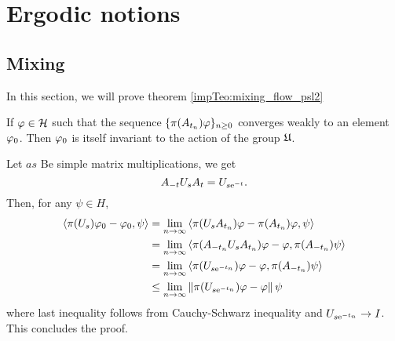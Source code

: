 
\chapter{Ergodic notions} %

\label{AppendixA} %
\thispagestyle{empty}
%
%
%
%
%
%
%
%
%


\section{Mixing}

In this section, we will prove theorem \ref{impTeo:mixing_flow_psl2}

\begin{nlem}
\label{lem:2.7_weakly_conv_invariant_phi_appendix}
If $\varphi\in\mathcal{H}$ such that the sequence $\{\pi(A_{t_{n}})\varphi\}_{n\geq0}$ converges weakly to an element $\varphi_{0}$. Then $\varphi_{0}$ is itself invariant to the action of the group $\mathfrak{U}$.
\end{nlem}
\begin{prf}
Let $as$ Be simple matrix multiplications, we get 
\[
A_{-t}U_{s}A_{t}=U_{s\mathrm{e}^{-t}}.
\]
Then, for any $\psi\in H$,
\begin{align*}
\left< \pi(U_{s})\varphi_{0}-\varphi_{0},\psi\right>&=\lim_{n\to\infty}\left< \pi(U_{s}A_{t_{n}})\varphi-\pi(A_{t_{n}})\varphi,\psi\right>\\
&=\lim_{n\to\infty}\left< \pi(A_{-t_{n}}U_{s}A_{t_{n}})\varphi-\varphi,\pi(A_{-t_{n}})\psi\right>\\
&=\lim_{n\to\infty}\left< \pi(U_{s\mathrm{e}^{-t_{n}}})\varphi-\varphi,\pi(A_{-t_{n}})\psi\right>\\
&\leq \lim_{n\to\infty}\left\lVert \pi(U_{s\mathrm{e}^{-t_{n}}})\varphi-\varphi\right\rVert{\psi}
\end{align*}
where last inequality follows from Cauchy-Schwarz inequality and $U_{s\mathrm{e}^{-t_{n}}}\to I$. This concludes the proof.
\end{prf}


